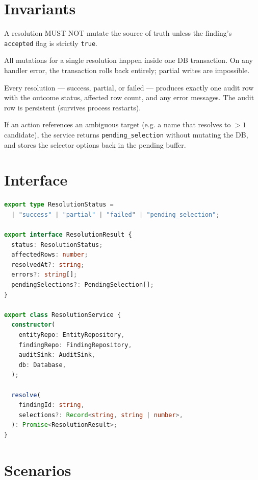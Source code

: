 \section{Invariants}
\begin{invariant}
A resolution MUST NOT mutate the source of truth unless the finding's \texttt{accepted} flag is strictly \texttt{true}.
\end{invariant}
\begin{invariant}
All mutations for a single resolution happen inside one DB transaction. On any handler error, the transaction rolls back entirely; partial writes are impossible.
\end{invariant}
\begin{invariant}
Every resolution --- success, partial, or failed --- produces exactly one audit row with the outcome status, affected row count, and any error messages. The audit row is persistent (survives process restarts).
\end{invariant}
\begin{invariant}
If an action references an ambiguous target (e.g. a name that resolves to $>1$ candidate), the service returns \texttt{pending\_selection} without mutating the DB, and stores the selector options back in the pending buffer.
\end{invariant}

\section{Interface}

\begin{lstlisting}[language=TypeScript]
export type ResolutionStatus =
  | "success" | "partial" | "failed" | "pending_selection";

export interface ResolutionResult {
  status: ResolutionStatus;
  affectedRows: number;
  resolvedAt?: string;
  errors?: string[];
  pendingSelections?: PendingSelection[];
}

export class ResolutionService {
  constructor(
    entityRepo: EntityRepository,
    findingRepo: FindingRepository,
    auditSink: AuditSink,
    db: Database,
  );

  resolve(
    findingId: string,
    selections?: Record<string, string | number>,
  ): Promise<ResolutionResult>;
}
\end{lstlisting}

\section{Scenarios}

